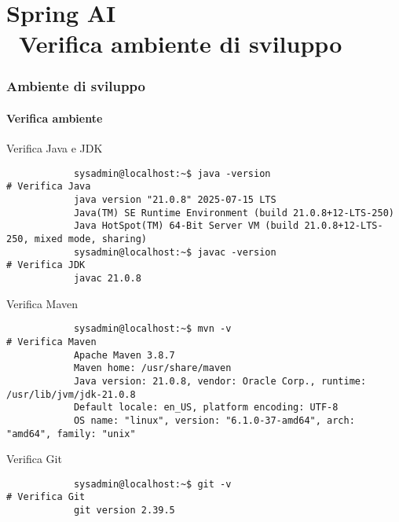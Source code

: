 \section{Spring AI\\{\small \faWrench\ Verifica ambiente di sviluppo}} %
\label{sec:diy-check-dev-env}
%
\begin{frame}[t,fragile] \frametitle{Ambiente di sviluppo}
\framesubtitle{Verifica ambiente}
    \vspace*{-.5cm}
    \begin{codeblock}{Verifica Java e JDK}
        \begin{verbatim}
            sysadmin@localhost:~$ java -version                          # Verifica Java
            java version "21.0.8" 2025-07-15 LTS
            Java(TM) SE Runtime Environment (build 21.0.8+12-LTS-250)
            Java HotSpot(TM) 64-Bit Server VM (build 21.0.8+12-LTS-250, mixed mode, sharing)
            sysadmin@localhost:~$ javac -version                         # Verifica JDK
            javac 21.0.8
        \end{verbatim}
    \end{codeblock}
    \begin{codeblock}{Verifica Maven}
        \begin{verbatim}
            sysadmin@localhost:~$ mvn -v                                 # Verifica Maven
            Apache Maven 3.8.7
            Maven home: /usr/share/maven
            Java version: 21.0.8, vendor: Oracle Corp., runtime: /usr/lib/jvm/jdk-21.0.8
            Default locale: en_US, platform encoding: UTF-8
            OS name: "linux", version: "6.1.0-37-amd64", arch: "amd64", family: "unix"
        \end{verbatim}
    \end{codeblock}
    \begin{codeblock}{Verifica Git}   
        \begin{verbatim}
            sysadmin@localhost:~$ git -v                                 # Verifica Git
            git version 2.39.5
        \end{verbatim}
    \end{codeblock}
\end{frame}
%
